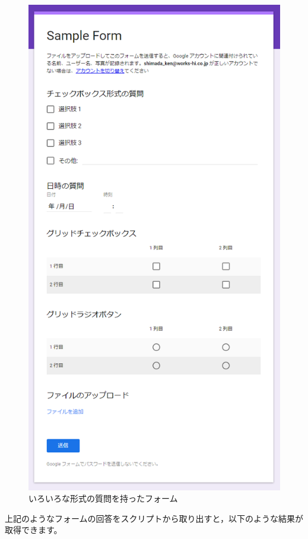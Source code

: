 \documentclass[uplatex,a4j]{jsarticle}
\begin{document}
\begin{figure}[H]
 \centering
 \includegraphics[keepaspectratio, scale=0.5]{images/various_question.png}
 \caption{いろいろな形式の質問を持ったフォーム}
 \label{fig:various_question}
\end{figure}

上記のようなフォームの回答をスクリプトから取り出すと，以下のような結果が取得できます。
\end{document}
